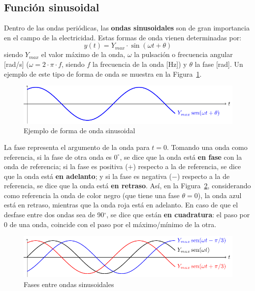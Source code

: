 \subsection{Función sinusoidal}\label{sec.sinusoidal}
Dentro de las ondas periódicas, las \textbf{ondas sinusoidales} son de
gran importancia en el campo de la electricidad. Estas formas de onda
vienen determinadas por:
\begin{equation}\label{eq.y_senoidal}
  \boxed{y(t)=Y_{max}\cdot\sin(\omega t+\theta)} 
\end{equation}
siendo $Y_{max}$ el valor máximo de la onda, $\omega$ la pulsación o
frecuencia angular [rad/s] ($\omega=2\cdot\pi\cdot f$, siendo $f$ la
frecuencia de la onda [Hz]) y $\theta$ la fase [rad]. Un ejemplo de
este tipo de forma de onda se muestra en la Figura~\ref{fig.sin}.
\begin{figure}[H]
  \centering \includegraphics[width=.9\linewidth]{../figs/sin.pdf}
  \caption{Ejemplo de forma de onda sinusoidal}
  \label{fig.sin}
\end{figure}
	
La fase representa el argumento de la onda para $t=0$. Tomando una
onda como referencia, si la fase de otra onda es $0^\circ$, se dice
que la onda está \textbf{en fase} con la onda de referencia; si la
fase es positiva ($+$) respecto a la de referencia, se dice que la
onda está \textbf{en adelanto}; y si la fase es negativa ($-$)
respecto a la de referencia, se dice que la onda está \textbf{en
  retraso}. Así, en la Figura~\ref{fig.desfase}, considerando como
referencia la onda de color negro (que tiene una fase $\theta=0$), la
{\color{blue} onda azul} está en retraso, mientras que la {\color{red}
  onda roja} está en adelanto. En caso de que el desfase entre dos
ondas sea de 90$^\circ$, se dice que están \textbf{en cuadratura}: el
paso por 0 de una onda, coincide con el paso por el máximo/mínimo de
la otra.
\begin{figure}[H]
  \centering \includegraphics[width=.9\linewidth]{../figs/desfase.pdf}
  \caption{Fases entre ondas sinusoidales}
  \label{fig.desfase}
\end{figure}
	
